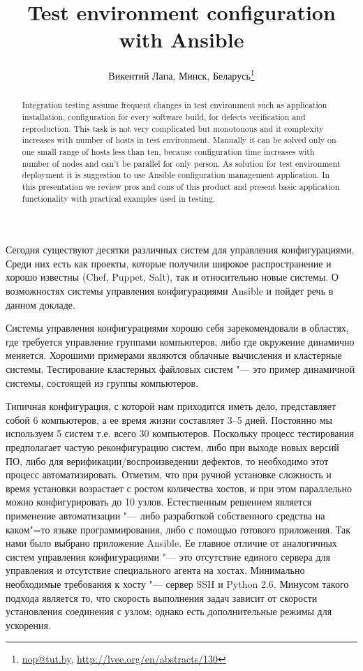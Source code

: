 \documentclass[10pt, a5paper]{article}
\begin{document}
\title{Test environment configuration with Ansible}
\author{Викентий Лапа, Минск, Беларусь\footnote{\url{nop@tut.by}, \url{http://lvee.org/en/abstracts/130}}}
\maketitle
\begin{abstract}
Integration testing assume frequent changes in test environment such as application installation, configuration for every software build, for defects verification and reproduction. This task is not very complicated but monotonous and it complexity increases with number of hosts in test environment. Manually it can be solved only on one small range of hosts less than ten, because configuration time increases with number of nodes and can't be parallel for only person. As solution for test environment deployment it is suggestion to use Ansible configuration management application. In this presentation we review pros and cons of this product and present basic application functionality with practical examples used in testing. 
\end{abstract}
Сегодня существуют десятки различных систем для управления конфигурациями. Среди них есть как проекты, которые получили широкое распространение и хорошо известны (Chef, Puppet, Salt), так и относительно новые системы. О возможностях системы управления конфигурациями Ansible и пойдет речь в данном докладе.

Системы управления конфигурациями хорошо себя зарекомендовали в областях, где требуется управление группами компьютеров, либо где окружение динамично меняется. Хорошими примерами являются облачные вычисления и кластерные системы. Тестирование кластерных файловых систем "--- это пример динамичной системы, состоящей из группы компьютеров.

Типичная конфигурация, с которой нам приходится иметь дело, представляет собой 6 компьютеров, а ее время жизни составляет 3--5 дней. Постоянно мы используем 5 систем т.е. всего 30 компьютеров. Поскольку процесс тестирования предполагает частую реконфигурацию систем, либо при выходе новых версий ПО, либо для верификации/воспроизведении дефектов, то необходимо этот процесс автоматизировать. Отметим, что при ручной установке сложность и время установки возрастает с ростом количества хостов, и при этом параллельно можно конфигурировать до 10 узлов. Естественным решением является применение автоматизации "--- либо разработкой собственного средства на каком"=то языке программирования, либо с помощью готового приложения. Так нами было выбрано приложение Ansible. Ее главное отличие от аналогичных систем управления конфигурациями "--- это отсутствие единого сервера для управления и отсутствие специального агента на хостах. Минимально необходимые требования к хосту "--- сервер SSH и Python 2.6. Минусом такого подхода является то, что скорость выполнения задач зависит от скорости установления соединения с узлом; однако есть дополнительные режимы для ускорения.
\end{document}
